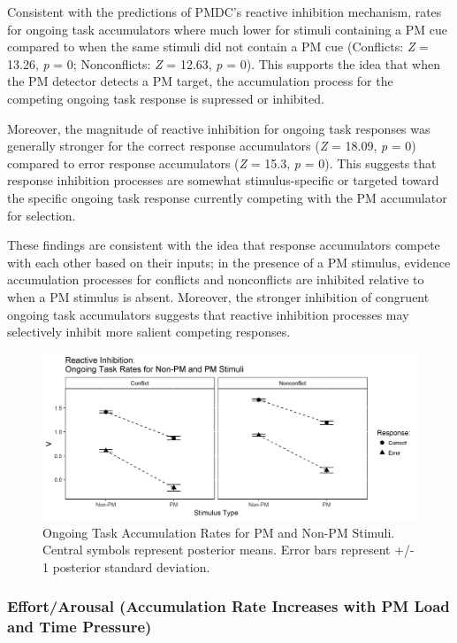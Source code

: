 \documentclass[11pt,]{article}
\begin{document}
Consistent with the predictions of PMDC's reactive inhibition mechanism,
rates for ongoing task accumulators where much lower for stimuli
containing a PM cue compared to when the same stimuli did not contain a
PM cue (Conflicts: \emph{Z} = 13.26, \emph{p} = 0; Nonconflicts:
\emph{Z} = 12.63, \emph{p} = 0). This supports the idea that when the PM
detector detects a PM target, the accumulation process for the competing
ongoing task response is supressed or inhibited.

Moreover, the magnitude of reactive inhibition for ongoing task
responses was generally stronger for the correct response accumulators
(\emph{Z} = 18.09, \emph{p} = 0) compared to error response accumulators
(\emph{Z} = 15.3, \emph{p} = 0). This suggests that response inhibition
processes are somewhat stimulus-specific or targeted toward the specific
ongoing task response currently competing with the PM accumulator for
selection.

These findings are consistent with the idea that response accumulators
compete with each other based on their inputs; in the presence of a PM
stimulus, evidence accumulation processes for conflicts and nonconflicts
are inhibited relative to when a PM stimulus is absent. Moreover, the
stronger inhibition of congruent ongoing task accumulators suggests that
reactive inhibition processes may selectively inhibit more salient
competing responses.

\begin{figure}
\includegraphics[width=0.8\linewidth]{figures/E1/E1.Reactive.Inhibition} \caption{\label{fig:Reactive.Inhibition}Ongoing Task Accumulation Rates for PM and Non-PM Stimuli. Central symbols represent posterior means. Error bars represent +/- 1 posterior standard deviation.}\label{fig:Plot: Reactive Inhibition}
\end{figure}

\subsubsection{Effort/Arousal (Accumulation Rate Increases with PM Load
and Time
Pressure)}\label{effortarousal-accumulation-rate-increases-with-pm-load-and-time-pressure}
\end{document}
